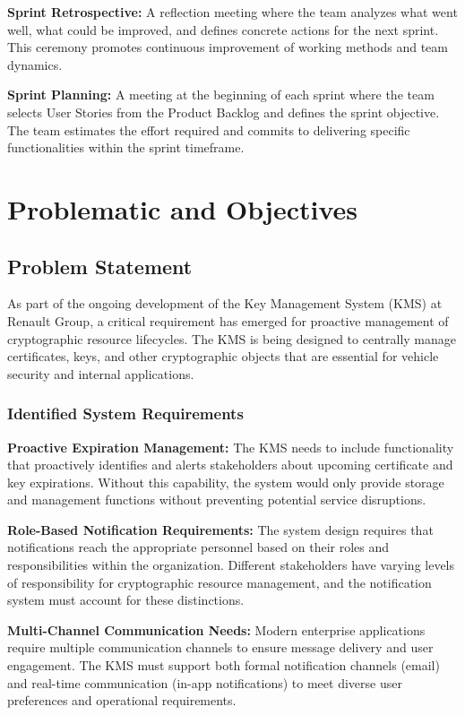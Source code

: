 \newpage
\noindent
\textbf{Sprint Retrospective:} A reflection meeting where the team analyzes what went well, what could be improved, and defines concrete actions for the next sprint. This ceremony promotes continuous improvement of working methods and team dynamics.

\noindent
\textbf{Sprint Planning:} A meeting at the beginning of each sprint where the team selects User Stories from the Product Backlog and defines the sprint objective. The team estimates the effort required and commits to delivering specific functionalities within the sprint timeframe.

\section{Problematic and Objectives}

\subsection{Problem Statement}

As part of the ongoing development of the Key Management System (KMS) at Renault Group, a critical requirement has emerged for proactive management of cryptographic resource lifecycles. The KMS is being designed to centrally manage certificates, keys, and other cryptographic objects that are essential for vehicle security and internal applications.

\subsubsection{Identified System Requirements}

\textbf{Proactive Expiration Management:} The KMS needs to include functionality that proactively identifies and alerts stakeholders about upcoming certificate and key expirations. Without this capability, the system would only provide storage and management functions without preventing potential service disruptions.

\noindent
\textbf{Role-Based Notification Requirements:} The system design requires that notifications reach the appropriate personnel based on their roles and responsibilities within the organization. Different stakeholders have varying levels of responsibility for cryptographic resource management, and the notification system must account for these distinctions.

\noindent
\textbf{Multi-Channel Communication Needs:} Modern enterprise applications require multiple communication channels to ensure message delivery and user engagement. The KMS must support both formal notification channels (email) and real-time communication (in-app notifications) to meet diverse user preferences and operational requirements.

